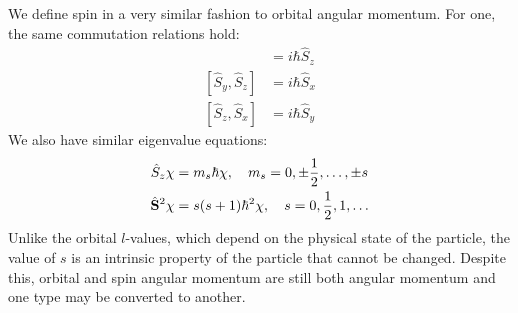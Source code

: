 \documentclass[../p052main.tex]{subfiles}
\begin{document}
We define spin in a very similar fashion to orbital angular momentum.
For one, the same commutation relations hold:
\begin{align*}
    [\hat S_x, \hat S_y] &= i\hbar \hat S_z \\
    [\hat S_y, \hat S_z] &= i\hbar \hat S_x \\
    [\hat S_z, \hat S_x] &= i\hbar \hat S_y
\end{align*}
We also have similar eigenvalue equations:
\begin{align*}
    \hat S_z \chi &= m_s \hbar \chi, \quad m_s = 0, \pm \frac{1}{2}, \ldots, \pm s \\
    \hat{\mathbf{S}}^2 \chi &= s(s+1)\hbar^2 \chi, \quad s = 0, \frac{1}{2}, 1, \ldots
\end{align*}
Unlike the orbital $l$-values, which depend on the physical state of the particle, the value of $s$ is an intrinsic property of the particle that cannot be changed.
Despite this, orbital and spin angular momentum are still both angular momentum and one type may be converted to another.
\end{document}
